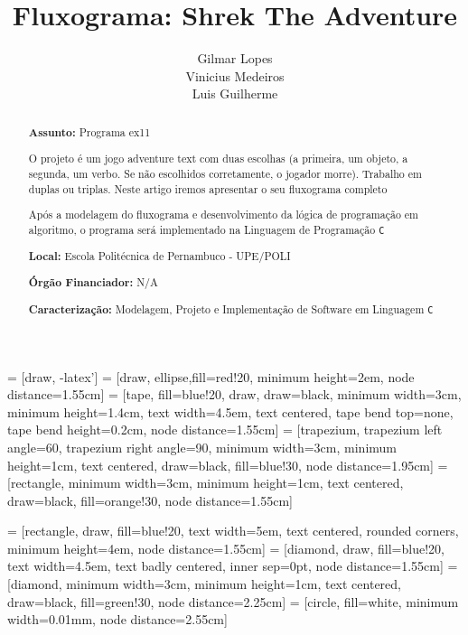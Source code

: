 \documentclass[a4paper,12pt]{article} %
\title{Fluxograma: Shrek The Adventure}
\author{Gilmar Lopes \\ Vinicius Medeiros \\ Luis Guilherme}
\begin{document}
\maketitle


 = [draw, -latex']
 = [draw, ellipse,fill=red!20, minimum height=2em, node distance=1.55cm]
 = [tape, fill=blue!20, draw, draw=black, minimum width=3cm, minimum height=1.4cm, text width=4.5em, text centered, tape bend top=none, tape bend height=0.2cm, node distance=1.55cm]
 = [trapezium, trapezium left angle=60, trapezium right angle=90, minimum width=3cm, minimum height=1cm, text centered, draw=black, fill=blue!30, node distance=1.95cm]
 = [rectangle, minimum width=3cm, minimum height=1cm, text centered, draw=black, fill=orange!30, node distance=1.55cm]

 = [rectangle, draw, fill=blue!20, text width=5em, text centered, rounded corners, minimum height=4em, node distance=1.55cm]
 = [diamond, draw, fill=blue!20, text width=4.5em, text badly centered, inner sep=0pt, node distance=1.55cm]
 = [diamond, minimum width=3cm, minimum height=1cm, text centered, draw=black, fill=green!30, node distance=2.25cm]
 = [circle, fill=white, minimum width=0.01mm, node distance=2.55cm]


\begin{abstract}

\textbf{Assunto:} Programa ex11


O projeto é um jogo adventure text com duas escolhas (a primeira, um objeto, a segunda, um verbo. Se não escolhidos corretamente, o jogador morre). Trabalho em duplas ou triplas. Neste artigo iremos apresentar o seu fluxograma completo

Após a modelagem do fluxograma e desenvolvimento da lógica de programação em algoritmo,
o programa será implementado na Linguagem de Programação \texttt{C}


\textbf{Local:} Escola Politécnica de Pernambuco - UPE/POLI

\textbf{Órgão Financiador:} N/A

\textbf{Caracterização:} Modelagem, Projeto e Implementação de Software em Linguagem \texttt{C}


\end{abstract}
\end{document}
